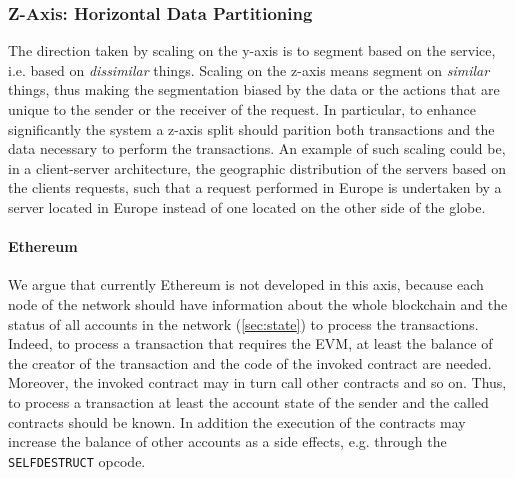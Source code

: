 \subsubsection{Z-Axis: Horizontal Data Partitioning}

The direction taken by scaling on the y-axis is to segment based on the service,
i.e. based on \emph{dissimilar} things. Scaling on the z-axis means segment on
\emph{similar} things, thus making the segmentation biased by the data or the
actions that are unique to the sender or the receiver of the request. In
particular, to enhance significantly the system a z-axis split should parition
both transactions and the data necessary to perform the transactions. An example
of such scaling could be, in a client-server architecture, the geographic
distribution of the servers based on the clients requests, such that a request
performed in Europe is undertaken by a server located in Europe instead of one
located on the other side of the globe.


\paragraph{Ethereum} We argue that currently Ethereum is not developed in this
axis, because each node of the network should have information about the whole
blockchain and the status of all accounts in the network (\autoref{sec:state})
to process the transactions. Indeed, to process a transaction that requires the
EVM, at least the balance of the creator of the transaction and the code of the
invoked contract are needed.
Moreover, the invoked contract may in turn call other contracts and so on.
Thus, to process a transaction at least the account state of the sender and the
called contracts should be known. In addition the execution of the contracts may
increase the balance of other accounts as a side effects, e.g. through the
\texttt{SELFDESTRUCT} opcode.
